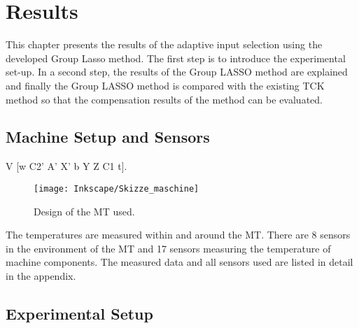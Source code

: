 \chapter{Results}
\label{chp:results}

This chapter presents the results of the adaptive input selection using the developed Group Lasso method. The first step is to introduce the experimental set-up. In a second step, the results of the Group LASSO method are explained and finally the Group LASSO method is compared with the existing TCK method so that the compensation results of the method can be evaluated.


\section{Machine Setup and Sensors}
\label{sec:machine_setup}



V [w C2' A' X' b Y Z C1 t].

\begin{figure}[!htb]
    \centering
    \texttt{[image: Inkscape/Skizze\_maschine]} %
    \caption[Design of the machine]{Design of the MT used.}
    \label{fig:Design}
\end{figure}

The temperatures are measured within and around the MT. There are 8 sensors in the environment of the MT and 17 sensors measuring the temperature of machine components. The measured data and all sensors used are listed in detail in the appendix.

\section{Experimental Setup}
\label{sec:experimentalsetup}


